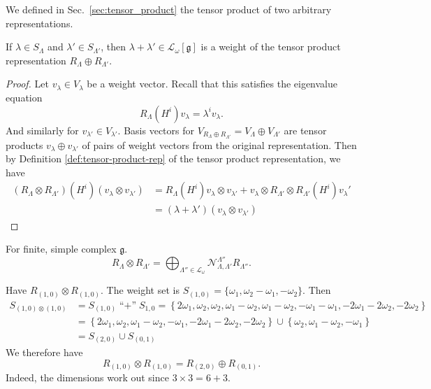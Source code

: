 We defined in Sec.~\ref{sec:tensor_product} the tensor product of two arbitrary representations.

\begin{claim}
  If $\lambda \in S_\Lambda$ and $\lambda' \in S_{\Lambda'}$, then $\lambda + \lambda' \in \mathcal{L}_\omega [\mathfrak{g}]$ is a weight of the tensor product representation $R_{\Lambda} \oplus R_{\Lambda'}$.
\end{claim}
\begin{proof}
  Let $v_{\lambda} \in V_{\lambda}$ be a weight vector. Recall that this satisfies the eigenvalue equation
  \begin{equation}
    R_{\Lambda}(H^{i}) v_{\lambda} = \lambda^{i} v_{\lambda}.
  \end{equation}
  And similarly for $v_{\lambda'} \in V_{\lambda'}$.
  Basis vectors for $V_{R_\Lambda \oplus R_{\Lambda'}} = V_{\Lambda} \oplus V_{\Lambda'}$ are tensor products $v_{\lambda} \oplus v_{\lambda'}$ of pairs of weight vectors from the original representation.
  Then by Definition \ref{def:tensor-product-rep} of the tensor product representation, we have
  \begin{align}
    (R_{\Lambda} \otimes R_{\Lambda'})(H^{i}) (v_{\lambda} \otimes v_{\lambda'}) &= R_{\Lambda}(H^{i}) v_{\lambda} \otimes v_{\lambda'} + v_\lambda \otimes R_{\Lambda'} \otimes R_{\Lambda'} (H^{i}) v_{\lambda}' \\
										 &= (\lambda + \lambda') (v_{\lambda} \otimes v_{\lambda'})
  \end{align}
\end{proof}

For finite, simple complex $\mathfrak{g}$.
\begin{equation}
  R_{\Lambda} \otimes R_{\Lambda'} = \bigoplus_{\Lambda'' \in \mathcal{L}_\omega} \mathcal{N}_{\Lambda, \Lambda'}^{\Lambda''} R_{\Lambda''}.
\end{equation}

\begin{example}[$\mathfrak{g} = A_2$]
  Have $R_{(1, 0)} \otimes R_{(1, 0)}$. The weight set is $S_{(1, 0)} = \{\omega_1, \omega_2 - \omega_1, -\omega_2\}$. Then
  \begin{align}
    S_{(1, 0) \otimes (1, 0)} &= S_{(1, 0)} \mathop{\text{``+''}} S_{1, 0} = \left\{ 2 \omega_1, \omega_2, \omega_2, \omega_1 - \omega_2, \omega_1 - \omega_2, -\omega_1-\omega_1, -2\omega_1 - 2\omega_2, -2\omega_2 \right\} \\
    &= \left\{ 2\omega_1, \omega_2, \omega_1 - \omega_2, -\omega_1, -2\omega_1 -2\omega_2, -2\omega_2 \right\} \cup \left\{ \omega_2, \omega_1 - \omega_2, -\omega_1 \right\} \\
    &= S_{(2, 0)} \cup S_{(0, 1)}
  \end{align}
  We therefore have
  \begin{equation}
    R_{(1, 0)} \otimes R_{(1, 0)} = R_{(2, 0)} \oplus R_{(0, 1)}.
  \end{equation}
  Indeed, the dimensions work out since $3 \times 3 = 6 + 3$.
\end{example}

